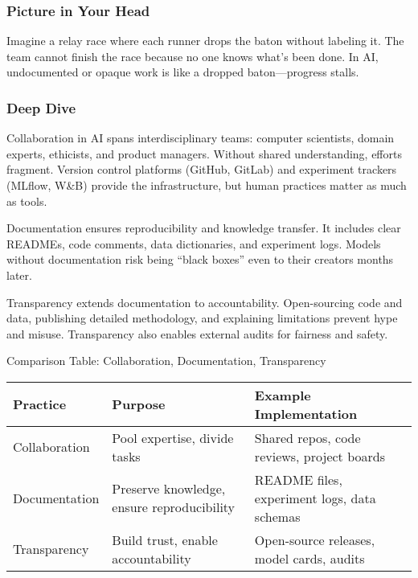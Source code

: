 \documentclass[
  letterpaper,
  DIV=11,
  numbers=noendperiod]{scrreprt}
\begin{document}
\subsubsection{Picture in Your Head}\label{picture-in-your-head-93}

Imagine a relay race where each runner drops the baton without labeling
it. The team cannot finish the race because no one knows what's been
done. In AI, undocumented or opaque work is like a dropped
baton---progress stalls.

\subsubsection{Deep Dive}\label{deep-dive-93}

Collaboration in AI spans interdisciplinary teams: computer scientists,
domain experts, ethicists, and product managers. Without shared
understanding, efforts fragment. Version control platforms (GitHub,
GitLab) and experiment trackers (MLflow, W\&B) provide the
infrastructure, but human practices matter as much as tools.

Documentation ensures reproducibility and knowledge transfer. It
includes clear READMEs, code comments, data dictionaries, and experiment
logs. Models without documentation risk being ``black boxes'' even to
their creators months later.

Transparency extends documentation to accountability. Open-sourcing code
and data, publishing detailed methodology, and explaining limitations
prevent hype and misuse. Transparency also enables external audits for
fairness and safety.

Comparison Table: Collaboration, Documentation, Transparency

\begin{longtable}[]{@{}
  >{\raggedright\arraybackslash}p{}
  >{\raggedright\arraybackslash}p{}
  >{\raggedright\arraybackslash}p{}@{}}
\toprule\noalign{}
\begin{minipage}[b]{\linewidth}\raggedright
Practice
\end{minipage} & \begin{minipage}[b]{\linewidth}\raggedright
Purpose
\end{minipage} & \begin{minipage}[b]{\linewidth}\raggedright
Example Implementation
\end{minipage} \\
\midrule\noalign{}
\endhead
\bottomrule\noalign{}
\endlastfoot
Collaboration & Pool expertise, divide tasks & Shared repos, code
reviews, project boards \\
Documentation & Preserve knowledge, ensure reproducibility & README
files, experiment logs, data schemas \\
Transparency & Build trust, enable accountability & Open-source
releases, model cards, audits \\
\end{longtable}
\end{document}
